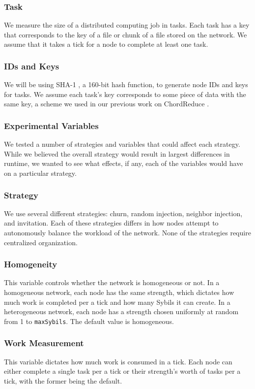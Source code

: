 \documentclass[11pt,conference]{IEEEtran}
\begin{document}
\subsubsection*{Task} We measure the size of a distributed computing job in tasks.
Each task has a key that corresponds to the key of a file or chunk of a file stored on the network.
We assume that it takes a tick for a node to complete at least one task.
\subsubsection*{IDs and Keys} We will be using SHA-1 \cite{sha1}, a 160-bit hash function, to generate node IDs and keys for tasks.  
We assume each task's key corresponds to some piece of data with the same key, a scheme we used in  our previous work on ChordReduce \cite{chordreduce}.
	
\subsubsection{Experimental Variables}
We tested a number of strategies and variables that could affect each strategy.
While we believed the overall strategy would result in largest differences in runtime, we wanted to see what effects, if any, each of the variables would have on a particular strategy.

\subsubsection*{Strategy} We use several different strategies: churn, random injection, neighbor injection, and invitation.
Each of these strategies differs in how nodes attempt  to autonomously balance the workload of the network.
None of the strategies require centralized organization.
\subsubsection*{Homogeneity}  This variable controls whether the network is homogeneous or not.
In a homogeneous network, each node has the same strength, which dictates how much work is completed per a tick and how many Sybils it can create.
In a heterogeneous network, each node has a strength chosen uniformly at random from 1 to \texttt{maxSybils}.
The default value is homogeneous.
\subsubsection*{Work Measurement} This variable dictates how much work is consumed in a tick.
Each node can either complete a single task per a tick or their strength's worth of tasks per a tick, with the former being the default.
\end{document}
